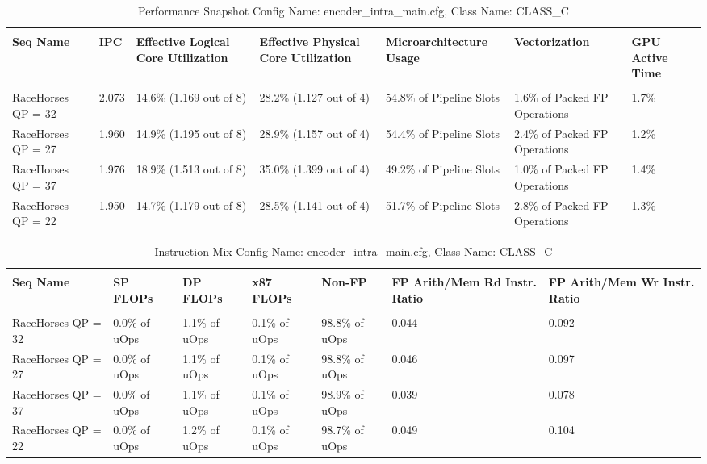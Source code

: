 \documentclass{article}%
\begin{document}
\begin{longtabu}{| X[l] | X[l] | X[l] | X[l] | X[l] | X[l] | X[l] |}%
\caption{%
Performance Snapshot\newline%
 Config Name: encoder\_intra\_main.cfg,\newline%
 Class Name: CLASS\_C\newline%
%
}%
\hline%
&&&&&&\\%
\textbf{Seq Name}&\textbf{IPC}&\textbf{Effective Logical Core Utilization}&\textbf{Effective Physical Core Utilization}&\textbf{Microarchitecture Usage}&\textbf{Vectorization}&\textbf{GPU Active Time}\\%
&&&&&&\\%
\hline%
\endhead%
RaceHorses\newline%
 QP = 32&2.073&14.6\% (1.169 out of 8)&28.2\% (1.127 out of 4)&54.8\% of Pipeline Slots&1.6\% of Packed FP Operations&1.7\%\\%
\hline%
RaceHorses\newline%
 QP = 27&1.960&14.9\% (1.195 out of 8)&28.9\% (1.157 out of 4)&54.4\% of Pipeline Slots&2.4\% of Packed FP Operations&1.2\%\\%
\hline%
RaceHorses\newline%
 QP = 37&1.976&18.9\% (1.513 out of 8)&35.0\% (1.399 out of 4)&49.2\% of Pipeline Slots&1.0\% of Packed FP Operations&1.4\%\\%
\hline%
RaceHorses\newline%
 QP = 22&1.950&14.7\% (1.179 out of 8)&28.5\% (1.141 out of 4)&51.7\% of Pipeline Slots&2.8\% of Packed FP Operations&1.3\%\\%
\hline%
\end{longtabu}%
\begin{longtabu}{| X[l] | X[l] | X[l] | X[l] | X[l] | X[l] | X[l] |}%
\caption{%
Instruction Mix\newline%
 Config Name: encoder\_intra\_main.cfg,\newline%
 Class Name: CLASS\_C\newline%
%
}%
\hline%
&&&&&&\\%
\textbf{Seq Name}&\textbf{SP FLOPs}&\textbf{DP FLOPs}&\textbf{x87 FLOPs}&\textbf{Non{-}FP}&\textbf{FP Arith/Mem Rd Instr. Ratio}&\textbf{FP Arith/Mem Wr Instr. Ratio}\\%
&&&&&&\\%
\hline%
\endhead%
RaceHorses\newline%
 QP = 32&0.0\% of uOps&1.1\% of uOps&0.1\% of uOps&98.8\% of uOps&0.044&0.092\\%
\hline%
RaceHorses\newline%
 QP = 27&0.0\% of uOps&1.1\% of uOps&0.1\% of uOps&98.8\% of uOps&0.046&0.097\\%
\hline%
RaceHorses\newline%
 QP = 37&0.0\% of uOps&1.1\% of uOps&0.1\% of uOps&98.9\% of uOps&0.039&0.078\\%
\hline%
RaceHorses\newline%
 QP = 22&0.0\% of uOps&1.2\% of uOps&0.1\% of uOps&98.7\% of uOps&0.049&0.104\\%
\hline%
\end{longtabu}%
\end{document}
